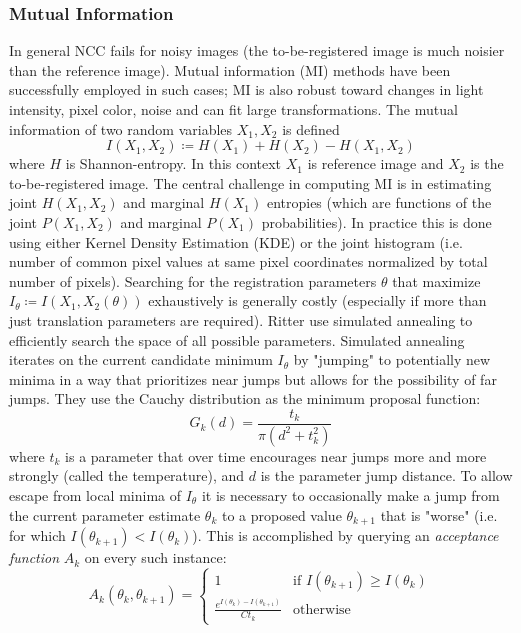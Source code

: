 \subsubsection{Mutual Information}

In general NCC fails for noisy images (the to-be-registered image is much noisier than the reference image).
%
Mutual information (MI) methods have been successfully employed in such cases; MI is also robust toward changes in light intensity, pixel color, noise and can fit large transformations.
%
The mutual information of two random variables \(X_1, X_2\) is defined
\[
	I (X_1,X_2) \coloneqq H (X_1)+H (X_2)-H (X_1,X_2)
\]
where \(H\) is Shannon-entropy.
%
In this context \(X_1\) is reference image and \(X_2\) is the to-be-registered image.
%
The central challenge in computing MI is in estimating joint \(H(X_1,X_2)\) and marginal \(H(X_1)\) entropies (which are functions of the joint \(P(X_1,X_2)\) and marginal \(P(X_1)\) probabilities).
%
In practice this is done using either Kernel Density Estimation (KDE) or the joint histogram (i.e. number of common pixel values at same pixel coordinates normalized by total number of pixels).
%
Searching for the registration parameters \(\theta\) that maximize \(I_{\theta} \coloneqq I(X_1,X_2(\theta))\) exhaustively is generally costly (especially if more than just translation parameters are required).
%
Ritter \etal\cite{ritter1999} use simulated annealing to efficiently search the space of all possible parameters.
%
Simulated annealing iterates on the current candidate minimum \(I_{\theta}\) by "jumping" to potentially new minima in a way that prioritizes near jumps but allows for the possibility of far jumps. They use the Cauchy distribution as the minimum proposal function:
\[
	G_k(d) = \frac{t_k}{\pi \left( d^2 + t_k^2 \right)}
\]
where \(t_k\) is a parameter that over time encourages near jumps more and more strongly (called the temperature), and \(d\) is the parameter jump distance.
%
To allow escape from local minima of \(I_{\theta}\) it is necessary to occasionally make a jump from the current parameter estimate \(\theta_k\) to a proposed value \(\theta_{k+1}\) that is "worse" (i.e. for which \(I(\theta_{k+1}) < I(\theta_{k}) \)).
%
This is accomplished by querying an \textit{acceptance function} \(A_k\) on every such instance:
\[
	A_k(\theta_{k}, \theta_{k+1}) = \begin{cases}
		1 & \text{if } I(\theta_{k+1}) \geq I(\theta_{k}) \\
		\frac{e^{I(\theta_{k}) - I(\theta_{k+1})}}{C t_k} &  \text{otherwise}
	\end{cases}
\]
